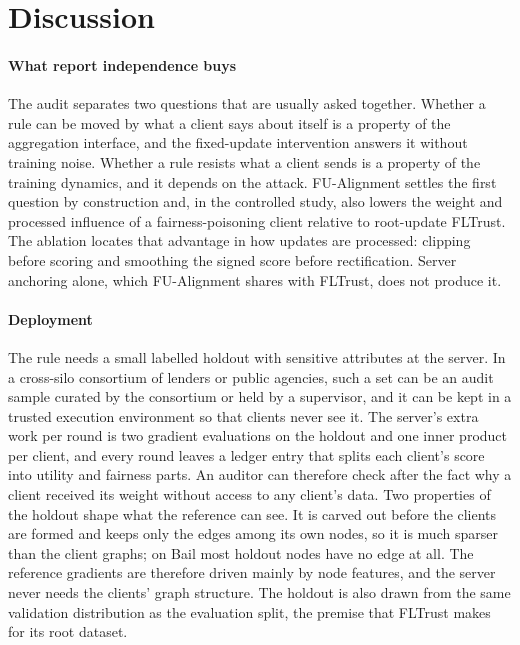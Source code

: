 \section{Discussion}
\label{sec:discussion}

\paragraph{What report independence buys}
The audit separates two questions that are usually asked together. Whether a rule can be moved by what a client says about itself is a property of the aggregation interface, and the fixed-update intervention answers it without training noise. Whether a rule resists what a client sends is a property of the training dynamics, and it depends on the attack. FU-Alignment settles the first question by construction and, in the controlled study, also lowers the weight and processed influence of a fairness-poisoning client relative to root-update FLTrust. The ablation locates that advantage in how updates are processed: clipping before scoring and smoothing the signed score before rectification. Server anchoring alone, which FU-Alignment shares with FLTrust, does not produce it.

\paragraph{Deployment}
The rule needs a small labelled holdout with sensitive attributes at the server. In a cross-silo consortium of lenders or public agencies, such a set can be an audit sample curated by the consortium or held by a supervisor, and it can be kept in a trusted execution environment so that clients never see it. The server's extra work per round is two gradient evaluations on the holdout and one inner product per client, and every round leaves a ledger entry that splits each client's score into utility and fairness parts. An auditor can therefore check after the fact why a client received its weight without access to any client's data. Two properties of the holdout shape what the reference can see. It is carved out before the clients are formed and keeps only the edges among its own nodes, so it is much sparser than the client graphs; on Bail most holdout nodes have no edge at all. The reference gradients are therefore driven mainly by node features, and the server never needs the clients' graph structure. The holdout is also drawn from the same validation distribution as the evaluation split, the premise that FLTrust makes for its root dataset.


